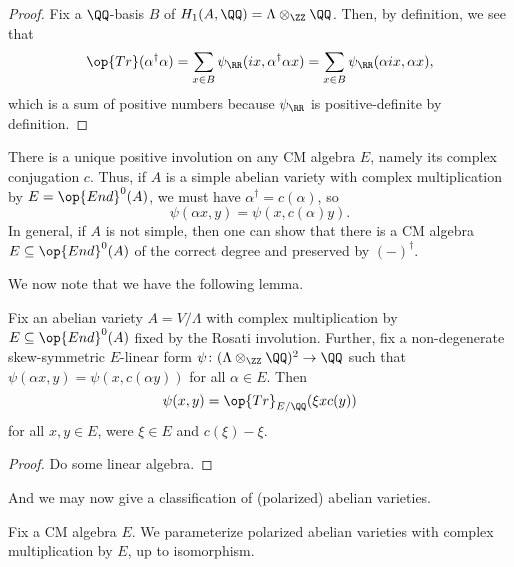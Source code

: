 \documentclass[../notes.tex]{subfiles}
\begin{document}
\begin{proof}
	Fix a $\QQ$-basis $B$ of $H_1(A,\QQ)=\Lambda\otimes_\ZZ\QQ$. Then, by definition, we see that
	\[\op{Tr}(\alpha^\dag\alpha)=\sum_{x\in B}\psi_\RR(ix,\alpha^\dag\alpha x)=\sum_{x\in B}\psi_\RR(\alpha ix,\alpha x),\]
	which is a sum of positive numbers because $\psi_\RR$ is positive-definite by definition.
\end{proof}
\begin{remark}
	There is a unique positive involution on any CM algebra $E$, namely its complex conjugation $c$. Thus, if $A$ is a simple abelian variety with complex multiplication by $E=\op{End}^0(A)$, we must have $\alpha^\dag=c(\alpha)$, so
	\[\psi(\alpha x,y)=\psi(x,c(\alpha)y).\]
	In general, if $A$ is not simple, then one can show that there is a CM algebra $E\subseteq\op{End}^0(A)$ of the correct degree and preserved by $(-)^\dag$.
\end{remark}
We now note that we have the following lemma.
\begin{lemma}
	Fix an abelian variety $A=V/\Lambda$ with complex multiplication by $E\subseteq\op{End}^0(A)$ fixed by the Rosati involution. Further, fix a non-degenerate skew-symmetric $E$-linear form $\psi\colon(\Lambda\otimes_\ZZ\QQ)^2\to\QQ$ such that $\psi(\alpha x,y)=\psi(x,c(\alpha y))$ for all $\alpha\in E$. Then
	\[\psi(x,y)=\op{Tr}_{E/\QQ}(\xi xc(y))\]
	for all $x,y\in E$, were $\xi\in E$ and $c(\xi)-\xi$.
\end{lemma}
\begin{proof}
	Do some linear algebra.
\end{proof}
And we may now give a classification of (polarized) abelian varieties.
\begin{theorem}
	Fix a CM algebra $E$. We parameterize polarized abelian varieties with complex multiplication by $E$, up to isomorphism.
\end{theorem}
\end{document}

